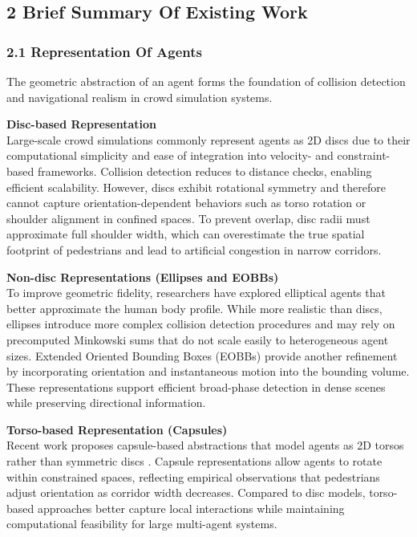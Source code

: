 \subsection{2 Brief Summary Of Existing Work}


\subsubsection{2.1 Representation Of Agents}
The geometric abstraction of an agent forms the foundation of collision detection and navigational realism in crowd simulation systems.

\vspace{0.5em}
\textbf{Disc-based Representation}\\
Large-scale crowd simulations commonly represent agents as 2D discs due to their computational simplicity and ease of integration into velocity- and constraint-based frameworks. Collision detection reduces to distance checks, enabling efficient scalability. However, discs exhibit rotational symmetry and therefore cannot capture orientation-dependent behaviors such as torso rotation or shoulder alignment in confined spaces. To prevent overlap, disc radii must approximate full shoulder width, which can overestimate the true spatial footprint of pedestrians and lead to artificial congestion in narrow corridors.

\vspace{0.5em}
\textbf{Non-disc Representations (Ellipses and EOBBs)}\\
To improve geometric fidelity, researchers have explored elliptical agents that better approximate the human body profile. While more realistic than discs, ellipses introduce more complex collision detection procedures and may rely on precomputed Minkowski sums that do not scale easily to heterogeneous agent sizes. Extended Oriented Bounding Boxes (EOBBs) provide another refinement by incorporating orientation and instantaneous motion into the bounding volume. These representations support efficient broad-phase detection in dense scenes while preserving directional information.

\vspace{0.5em}
\textbf{Torso-based Representation (Capsules)}\\
Recent work proposes capsule-based abstractions that model agents as 2D torsos rather than symmetric discs \cite{Talukdar2025}. Capsule representations allow agents to rotate within constrained spaces, reflecting empirical observations that pedestrians adjust orientation as corridor width decreases. Compared to disc models, torso-based approaches better capture local interactions while maintaining computational feasibility for large multi-agent systems.

